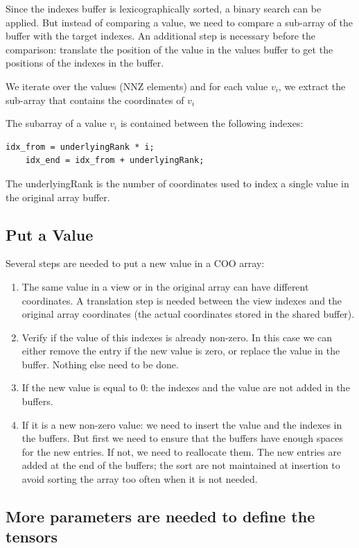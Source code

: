 Since the indexes buffer is lexicographically sorted, a binary search can be applied. But instead of comparing a value, we need to compare a sub-array of the buffer with the target indexes. An additional step is necessary before the comparison: translate the position of the value in the values buffer to get the positions of the indexes in the buffer.

We iterate over the values (NNZ elements) and for each value $v_{i}$, we extract the sub-array that contains the coordinates of $v_{i}$

The subarray of a value $v_{i}$ is contained between the following indexes: 
\begin{lstlisting}[style=nonumbers]
	idx_from = underlyingRank * i;
	idx_end = idx_from + underlyingRank;
\end{lstlisting}

The underlyingRank is the number of coordinates used to index a single value in the original array buffer.



\subsection{Put a Value}

Several steps are needed to put a new value in a COO array:
\begin{enumerate}
	\item The same value in a view or in the original array can have different coordinates. A translation step is needed between the view indexes and the original array coordinates (the actual coordinates stored in the shared buffer).
	\item Verify if the value of this indexes is already non-zero. In this case we can either remove the entry if the new value is zero, or replace the value in the buffer. Nothing else need to be done.
	\item If the new value is equal to 0: the indexes and the value are not added in the buffers.
	\item If it is a new non-zero value: we need to insert the value and the indexes in the buffers. But first we need to ensure that the buffers have enough spaces for the new entries. If not, we need to reallocate them. The new entries are added at the end of the buffers; the sort are not maintained at insertion to avoid sorting the array too often when it is not needed.
\end{enumerate}


\subsection{More parameters are needed to define the tensors}

